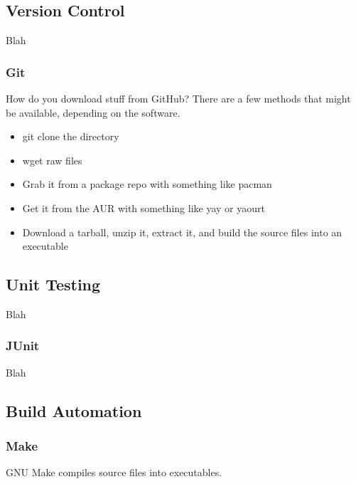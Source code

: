 \subsection{Version Control}

Blah

\subsubsection{Git}


How do you download stuff from GitHub? There are a few methods that might be available, depending on the software.
\begin{itemize}
	\item git clone the directory
	\item wget raw files
	\item Grab it from a package repo with something like pacman
	\item Get it from the AUR with something like yay or yaourt
	\item Download a tarball, unzip it, extract it, and build the source files into an executable
\end{itemize}


\subsection{Unit Testing}

Blah

\subsubsection{JUnit}

Blah

\subsection{Build Automation}

\subsubsection{Make}

GNU Make compiles source files into executables.


